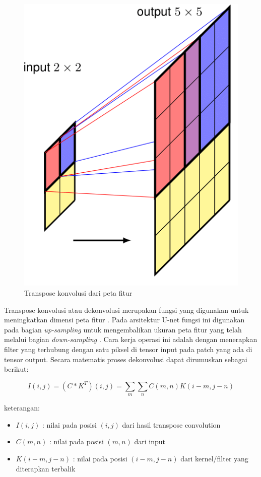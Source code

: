 \begin{figure}[H]
	\centering
	\includegraphics[scale=0.8]{gambar/deconv.png}
	\caption{Transpose konvolusi dari peta fitur \cite{bishop_deep_2024}}
	\label{fig:deconv}
\end{figure}


\noindent Transpose konvolusi atau dekonvolusi merupakan fungsi yang digunakan untuk meningkatkan dimensi peta fitur \cite{goodfellow_deep_2016,bishop_deep_2024}. Pada arsitektur U-net fungsi ini digunakan pada bagian \textit{up-sampling} untuk mengembalikan ukuran peta fitur yang telah melalui bagian \textit{down-sampling} \cite{azad_medical_2022}. Cara kerja operasi ini adalah dengan menerapkan filter yang terhubung dengan satu piksel di tensor input pada patch yang ada di tensor output. Secara matematis proses dekonvolusi dapat dirumuskan sebagai berikut:

\begin{equation}
	I(i,j) = (C * K^T)(i,j) = \sum_{m} \sum_{n} C(m, n) K(i - m, j - n)
\end{equation}

\noindent
keterangan:
\begin{itemize}
	\item $I(i,j)$ : nilai pada posisi $(i,j)$ dari hasil transpose convolution
	\item $C(m,n)$ : nilai pada posisi $(m,n)$ dari input
	\item $K(i-m, j-n)$ : nilai pada posisi $(i-m, j-n)$ dari kernel/filter yang diterapkan terbalik
\end{itemize}



